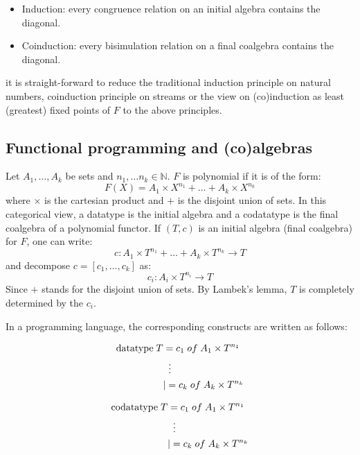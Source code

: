 \documentclass[notitlepage]{article}
\begin{document}
\begin{itemize}
	\item Induction: every congruence relation on an initial algebra contains the diagonal.
	\item Coinduction: every bisimulation relation on a final coalgebra contains the diagonal.
\end{itemize}

it is straight-forward to reduce the traditional induction principle on natural numbers, coinduction principle on streams or the view on (co)induction as least (greatest) fixed points of $F$ to the above principles.

\subsection{Functional programming and (co)algebras}

Let $A_1, \ldots , A_k$ be sets and $n_1, \ldots n_k \in \mathbb{N}$. $F$ is polynomial if it is of the form: \[F(X) = A_1 \times X^{n_1} + \ldots + A_k \times X^{n_k}\] where $\times$ is the cartesian product and $+$ is the disjoint union of sets. In this categorical view, a datatype is the initial algebra and a codatatype is the final coalgebra of a polynomial functor. If $(T,c)$ is an initial algebra (final coalgebra) for $F$, one can write: \[c: A_1 \times T^{n_1} + \ldots + A_k \times T^{n_k} \to T\] and decompose $c = [c_1,\ldots,c_k]$ as: \[c_i: A_i \times T^{n_i} \to T\] Since $+$ stands for the disjoint union of sets. By Lambek's lemma, $T$ is completely determined by the $c_i$. 

In a programming language, the corresponding constructs are written as follows:


\noindent\begin{minipage}{.5\linewidth}
\begin{align*}
\text{datatype} \; T &= c_1 \; of \; A_1 \times T^{n_1} \\
&\;\;\vdots \notag \\
&| = c_k \; of \; A_k \times T^{n_k} \\
\end{align*}
\end{minipage}%
\begin{minipage}{.5\linewidth}
\begin{align*}
\text{codatatype} \; T &= c_1 \; of \; A_1 \times T^{n_1} \\
&\;\;\vdots \notag \\
&| = c_k \; of \; A_k \times T^{n_k} \\
\end{align*}
\end{minipage}
\end{document}
